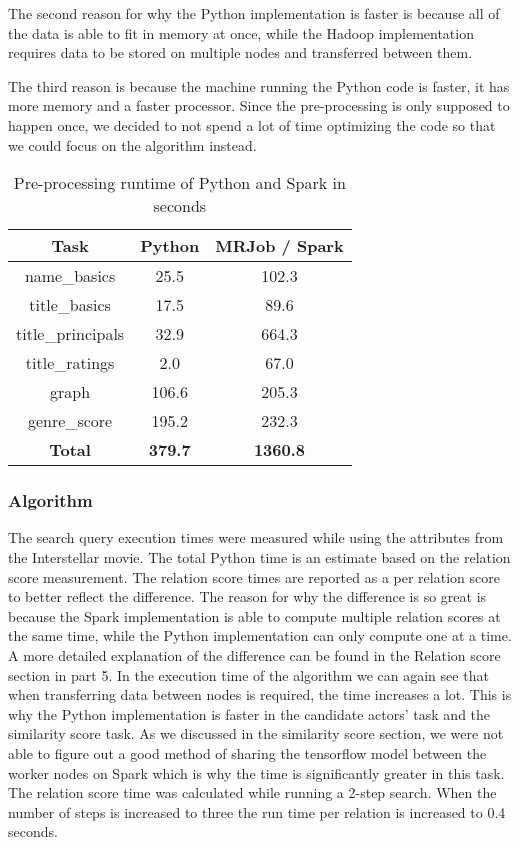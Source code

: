 The second reason for why the Python implementation is faster is because all of the data is able to fit in memory at once, while the Hadoop implementation requires data to be stored on multiple nodes and transferred between them. 

The third reason is because the machine running the Python code is faster, it has more memory and a faster processor. Since the pre-processing is only supposed to happen once, we decided to not spend a lot of time optimizing the code so that we could focus on the algorithm instead.



\begin{table}[H]
\centering
    \begin{tabular}{ |c|c|c| } 
        \hline
        \textbf{Task} & \textbf{Python} & \textbf{MRJob / Spark} \\ 
        \hline
        name\_basics & 25.5 & 102.3 \\ 
        title\_basics & 17.5 & 89.6 \\
        title\_principals & 32.9 & 664.3 \\ 
        title\_ratings & 2.0 & 67.0 \\ 
        graph & 106.6 & 205.3 \\ 
        genre\_score & 195.2 & 232.3 \\ \hline
        \textbf{Total} & \textbf{379.7} & \textbf{1360.8} \\ 
        \hline
    \end{tabular}
    \caption{Pre-processing runtime of Python and Spark in seconds}
    \label{tab:preprocess runtime}
\end{table}



\subsubsection{Algorithm}

The search query execution times were measured while using the attributes from the Interstellar movie. The total Python time is an estimate based on the relation score measurement. The relation score times are reported as a per relation score to better reflect the difference. The reason for why the difference is so great is because the Spark implementation is able to compute multiple relation scores at the same time, while the Python implementation can only compute one at a time. A more detailed explanation of the difference can be found in the Relation score section in part 5. In the execution time of the algorithm we can again see that when transferring data between nodes is required, the time increases a lot. This is why the Python implementation is faster in the candidate actors’ task and the similarity score task. As we discussed in the similarity score section, we were not able to figure out a good method of sharing the tensorflow model between the worker nodes on Spark which is why the time is significantly greater in this task. The relation score time was calculated while running a 2-step search. When the number of steps is increased to three the run time per relation is increased to 0.4 seconds.



